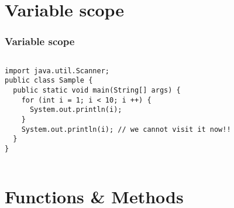 \documentclass[en, 11pt, xcolor=dvipsnames]{beamer}
\begin{document}
\section{Variable scope}
\begin{frame}[fragile]
	\frametitle{Variable scope}




	\begin{columns}[c]
		\begin{column}{0.98\textwidth}

			\begin{lstlisting}[style=Java]
import java.util.Scanner;
public class Sample {
  public static void main(String[] args) {
    for (int i = 1; i < 10; i ++) {
      System.out.println(i);
    }
    System.out.println(i); // we cannot visit it now!!
  }
}\end{lstlisting}

		\end{column}
	\end{columns}
\end{frame}


\section{Functions \& Methods}
\end{document}
